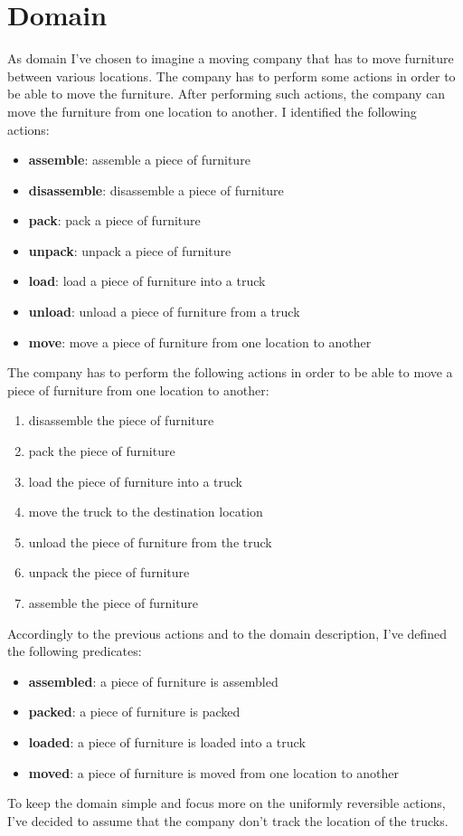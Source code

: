 \documentclass[12pt]{article}
\begin{document}
    \section{Domain}\label{sec:domain}
    As domain I've chosen to imagine a moving company that has to move furniture between various locations.
    The company has to perform some actions in order to be able to move the furniture.
    After performing such actions, the company can move the furniture from one location to another.
    I identified the following actions:
    \begin{itemize}
        \item \textbf{assemble}: assemble a piece of furniture
        \item \textbf{disassemble}: disassemble a piece of furniture
        \item \textbf{pack}: pack a piece of furniture
        \item \textbf{unpack}: unpack a piece of furniture
        \item \textbf{load}: load a piece of furniture into a truck
        \item \textbf{unload}: unload a piece of furniture from a truck
        \item \textbf{move}: move a piece of furniture from one location to another
    \end{itemize}
    The company has to perform the following actions in order to be able to move a piece of furniture from one location to another:
    \begin{enumerate}
        \item disassemble the piece of furniture
        \item pack the piece of furniture
        \item load the piece of furniture into a truck
        \item move the truck to the destination location
        \item unload the piece of furniture from the truck
        \item unpack the piece of furniture
        \item assemble the piece of furniture
    \end{enumerate}
    Accordingly to the previous actions and to the domain description, I've defined the following predicates:
    \begin{itemize}
        \item \textbf{assembled}: a piece of furniture is assembled
        \item \textbf{packed}: a piece of furniture is packed
        \item \textbf{loaded}: a piece of furniture is loaded into a truck
        \item \textbf{moved}: a piece of furniture is moved from one location to another
    \end{itemize}
    To keep the domain simple and focus more on the uniformly reversible actions, I've decided to assume that the company don't track the location of the trucks.
\end{document}
